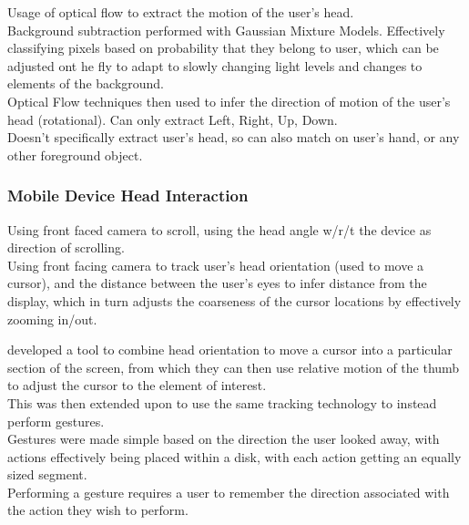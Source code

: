\cite{saikia2013head} Usage of optical flow to extract the motion of the user's head.\\
Background subtraction performed with Gaussian Mixture Models. Effectively classifying pixels based on probability that they belong to user, which can be adjusted ont he fly to adapt to slowly changing light levels and changes to elements of the background.\\ %
Optical Flow techniques then used to infer the direction of motion of the user's head (rotational). Can only extract Left, Right, Up, Down.\\
Doesn't specifically extract user's head, so can also match on user's hand, or any other foreground object.

\subsubsection{Mobile Device Head Interaction}

\cite{roig2015face} Using front faced camera to scroll, using the head angle w/r/t the device as direction of scrolling.\\

\cite{onuki2016combined} Using front facing camera to track user's head orientation (used to move a cursor), and the distance between the user's eyes to infer distance from the display, which in turn adjusts the coarseness of the cursor locations by effectively zooming in/out.

\cite{voelker2020headreach} developed a tool to combine head orientation to move a cursor into a particular section of the screen, from which they can then use relative motion of the thumb to adjust the cursor to the element of interest.\\

This was then extended upon \citep{hueber2020headbang} to use the same tracking technology to instead perform gestures.\\
Gestures were made simple based on the direction the user looked away, with actions effectively being placed within a disk, with each action getting an equally sized segment.\\
Performing a gesture requires a user to remember the direction associated with the action they wish to perform.

